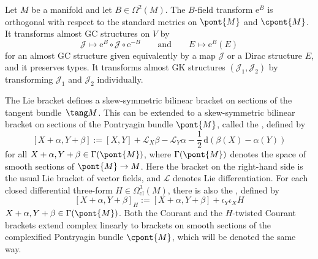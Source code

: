 \begin{Proposition}
Let $M$ be a manifold and let $B \in \Omega^2(M)$.
The $B$-field transform $\mathrm{e}^B$ is orthogonal with respect to the standard metrics on $\pont{M}$ and $\cpont{M}$.
It transforms almost GC structures on $V$ by
\[
  \mathcal{J} \mapsto \mathrm{e}^B \circ \mathcal{J} \circ \mathrm{e}^{-B}
  \qquad \text{and} \qquad
   E \mapsto \mathrm{e}^B(E)
\]
for an almost GC structure given equivalently by a map $\mathcal{J}$ or a Dirac structure $E$, and it preserves types.  It transforms almost GK structures $(\mathcal{J}_1,\mathcal{J}_2)$ by transforming $\mathcal{J}_1$ and $\mathcal{J}_2$ individually.
\end{Proposition}


The Lie bracket def\/ines a skew-symmetric bilinear bracket on sections of the tangent bund\-le~$\tang M$.  This can be extended to a skew-symmetric bilinear bracket on sections of the Pontryagin bundle $\pont{M}$, called the , def\/ined by
  \[
    [ X+\alpha, Y+\beta ]
    :=
    [X,Y] + \mathcal{L}_X \beta - \mathcal{L}_Y \alpha
    - \frac{1}{2} \, \mathrm{d} \left( \beta(X) - \alpha(Y) \right)
  \]
for all $X+\alpha, Y+\beta \in \Gamma(\pont{M})$, where $\Gamma(\pont{M})$ denotes the space of smooth sections of $\pont{M} \to M$.
Here the bracket on the right-hand side is the usual Lie bracket of vector f\/ields, and $\mathcal{L}$ denotes Lie dif\/ferentiation. For each closed dif\/ferential three-form $H \in \Omega_{\text{cl}}^3(M)$, there is also the , def\/ined by
  \[
    [ X+\alpha, Y+\beta ]_H
    :=
    [ X+\alpha, Y+\beta ]
    + \iota_Y \iota_X H
  \]
$X+\alpha, Y+\beta \in \Gamma(\pont{M})$.
Both the Courant and the $H$-twisted Courant brackets extend complex linearly to brackets on smooth sections of the complexif\/ied Pontryagin bundle $\cpont{M}$, which will be denoted the same way.


